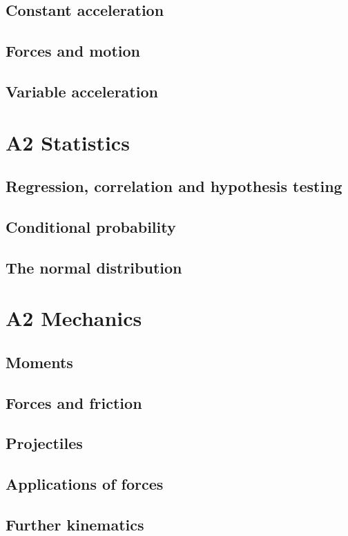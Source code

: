 \documentclass[oneside,fleqn,11pt]{book}
\begin{document}
\chapter{Constant acceleration}


\chapter{Forces and motion}


\chapter{Variable acceleration}



\part{A2 Statistics}
\chapter{Regression, correlation and hypothesis testing}


\chapter{Conditional probability}


\chapter{The normal distribution}


\part{A2 Mechanics}
\setcounter{chapter}{3}
\chapter{Moments}


\chapter{Forces and friction}


\chapter{Projectiles}


\chapter{Applications of forces}


\chapter{Further kinematics}

\end{document}
